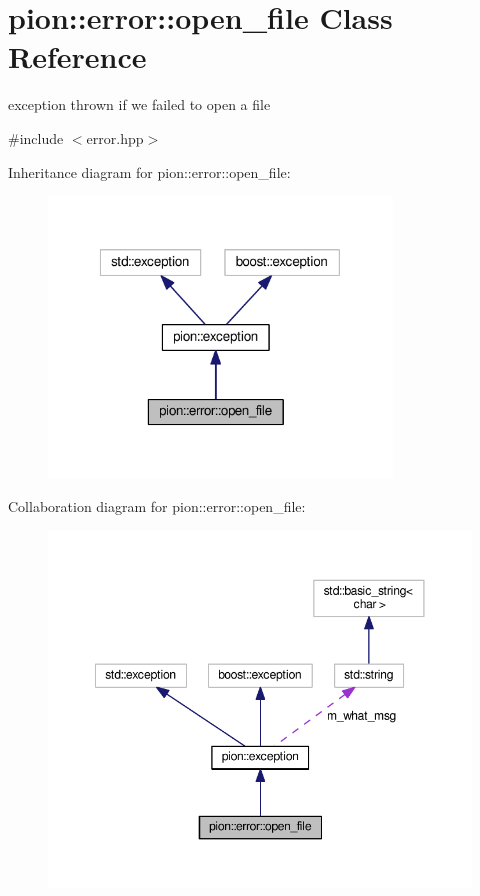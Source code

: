 \hypertarget{classpion_1_1error_1_1open__file}{\section{pion\-:\-:error\-:\-:open\-\_\-file Class Reference}
\label{classpion_1_1error_1_1open__file}
}


exception thrown if we failed to open a file  




{\ttfamily \#include $<$error.\-hpp$>$}



Inheritance diagram for pion\-:\-:error\-:\-:open\-\_\-file\-:
\nopagebreak
\begin{figure}[H]
\begin{center}
\leavevmode
\includegraphics[width=259pt]{classpion_1_1error_1_1open__file__inherit__graph}
\end{center}
\end{figure}


Collaboration diagram for pion\-:\-:error\-:\-:open\-\_\-file\-:
\nopagebreak
\begin{figure}[H]
\begin{center}
\leavevmode
\includegraphics[width=350pt]{classpion_1_1error_1_1open__file__coll__graph}
\end{center}
\end{figure}
